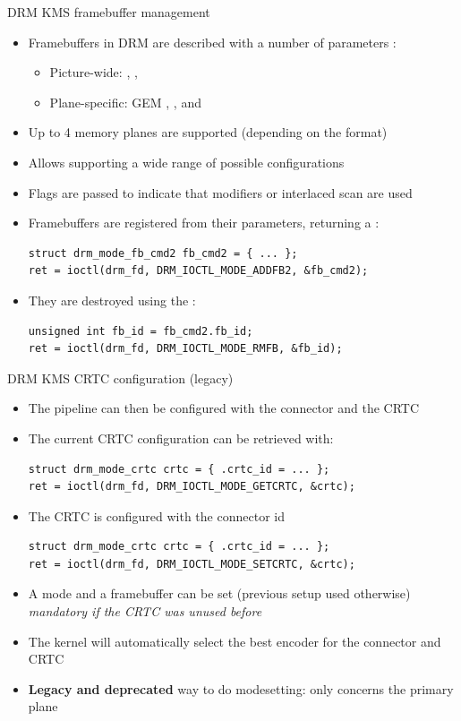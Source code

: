 \begin{frame}[fragile]{DRM KMS framebuffer management}
  \begin{itemize}
  \item Framebuffers in DRM are described with a number of parameters :
    \begin{itemize}
    \item Picture-wide: , , 
    \item Plane-specific: GEM , ,  and 
    \end{itemize}
  \item Up to 4 memory planes are supported (depending on the format)
  \item Allows supporting a wide range of possible configurations
  \item Flags are passed to indicate that modifiers or interlaced scan are used
  \item Framebuffers are registered from their parameters, returning a :
  \begin{verbatim}
struct drm_mode_fb_cmd2 fb_cmd2 = { ... };
ret = ioctl(drm_fd, DRM_IOCTL_MODE_ADDFB2, &fb_cmd2);
  \end{verbatim}
  \item They are destroyed using the :
  \begin{verbatim}
unsigned int fb_id = fb_cmd2.fb_id;
ret = ioctl(drm_fd, DRM_IOCTL_MODE_RMFB, &fb_id);
  \end{verbatim}
  \end{itemize}
\end{frame}

\begin{frame}[fragile]{DRM KMS CRTC configuration (legacy)}
  \begin{itemize}
  \item The pipeline can then be configured with the connector and the CRTC
  \item The current CRTC configuration can be retrieved with:
  \begin{verbatim}
struct drm_mode_crtc crtc = { .crtc_id = ... };
ret = ioctl(drm_fd, DRM_IOCTL_MODE_GETCRTC, &crtc);
  \end{verbatim}
  \item The CRTC is configured with the connector id
  \begin{verbatim}
struct drm_mode_crtc crtc = { .crtc_id = ... };
ret = ioctl(drm_fd, DRM_IOCTL_MODE_SETCRTC, &crtc);
  \end{verbatim}
  \item A mode and a framebuffer can be set (previous setup used otherwise)\\
  \textit{mandatory if the CRTC was unused before}
  \item The kernel will automatically select the best encoder for the connector and CRTC
  \item \textbf{Legacy and deprecated} way to do modesetting: only concerns the primary plane
  \end{itemize}
\end{frame}


